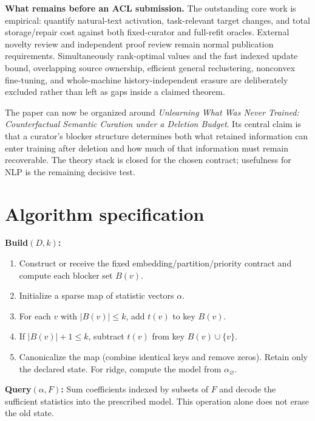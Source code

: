 \documentclass[11pt,a4paper]{article}
\theoremstyle{definition}\newtheorem{definition}[theorem]{Definition}
\begin{document}
\textbf{What remains before an ACL submission.} The outstanding core work is empirical: quantify natural-text activation, task-relevant target changes, and total storage/repair cost against both fixed-curator and full-refit oracles. External novelty review and independent proof review remain normal publication requirements. Simultaneously rank-optimal values and the fast indexed update bound, overlapping source ownership, efficient general reclustering, nonconvex fine-tuning, and whole-machine history-independent erasure are deliberately excluded rather than left as gaps inside a claimed theorem.

The paper can now be organized around \emph{Unlearning What Was Never Trained: Counterfactual Semantic Curation under a Deletion Budget}. Its central claim is that a curator's blocker structure determines both what retained information can enter training after deletion and how much of that information must remain recoverable. The theory stack is closed for the chosen contract; usefulness for NLP is the remaining decisive test.

\appendix
\section{Algorithm specification}\label{app:algorithms}
\textbf{Build$(D,k)$:}
\begin{enumerate}
\item Construct or receive the fixed embedding/partition/priority contract and compute each blocker set $B(v)$.
\item Initialize a sparse map of statistic vectors $\alpha$.
\item For each $v$ with $|B(v)|\le k$, add $t(v)$ to key $B(v)$.
\item If $|B(v)|+1\le k$, subtract $t(v)$ from key $B(v)\cup\{v\}$.
\item Canonicalize the map (combine identical keys and remove zeros). Retain only the declared state. For ridge, compute the model from $\alpha_\varnothing$.
\end{enumerate}
\textbf{Query$(\alpha,F)$:} Sum coefficients indexed by subsets of $F$ and decode the sufficient statistics into the prescribed model. This operation alone does not erase the old state.
\end{document}

